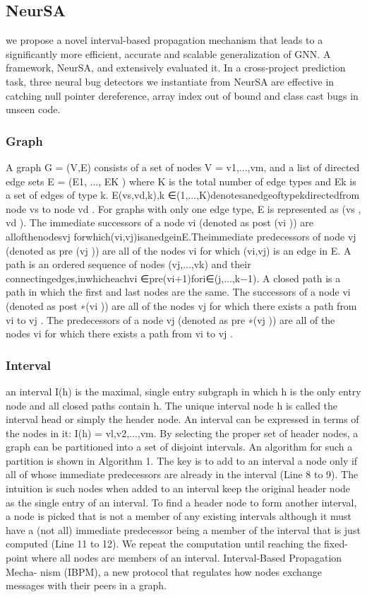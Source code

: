 \documentclass{article}
\begin{document}
\subsection{NeurSA}
we propose a novel interval-based propagation mechanism that leads to a significantly more efficient, accurate and scalable generalization of GNN. A framework, NeurSA, and extensively evaluated it. In a cross-project prediction task, three neural bug detectors we instantiate from NeurSA are effective in catching null pointer dereference, array index out of bound and class cast bugs in unseen code.
\subsubsection{Graph}
A graph G = (V,E) consists of a set of nodes V = {v1,...,vm}, and a list of directed edge sets E = (E1, ..., EK ) where K is the total number of edge types and Ek is a set of edges of type k. E(vs,vd,k),k ∈(1,...,K)denotesanedgeoftypekdirectedfrom node vs to node vd . For graphs with only one edge type, E is represented as (vs , vd ).
The immediate successors of a node vi (denoted as post (vi )) are allofthenodesvj forwhich(vi,vj)isanedgeinE.Theimmediate predecessors of node vj (denoted as pre (vj )) are all of the nodes vi for which (vi,vj) is an edge in E.
A path is an ordered sequence of nodes (vj,...,vk) and their connectingedges,inwhicheachvi ∈pre(vi+1)fori∈(j,...,k−1). A closed path is a path in which the first and last nodes are the same. The successors of a node vi (denoted as post ∗(vi )) are all of the nodes vj for which there exists a path from vi to vj . The predecessors of a node vj (denoted as pre ∗(vj )) are all of the nodes vi for which there exists a path from vi to vj .
\subsubsection{Interval}
an interval I(h) is the maximal, single entry subgraph in which h is the only entry node and all closed paths contain h. The unique interval node h is called the interval head or simply the header node. An interval can be expressed in terms of the nodes in it: I(h) = {vl,v2,...,vm}.
By selecting the proper set of header nodes, a graph can be partitioned into a set of disjoint intervals. An algorithm for such a partition is shown in Algorithm 1. The key is to add to an interval a node only if all of whose immediate predecessors are already in the interval (Line 8 to 9). The intuition is such nodes when added to an interval keep the original header node as the single entry of an interval. To find a header node to form another interval, a node is picked that is not a member of any existing intervals although it must have a (not all) immediate predecessor being a member of the interval that is just computed (Line 11 to 12). We repeat the computation until reaching the fixed-point where all nodes are members of an interval. Interval-Based Propagation Mecha- nism (IBPM), a new protocol that regulates how nodes exchange messages with their peers in a graph. 
\end{document}
